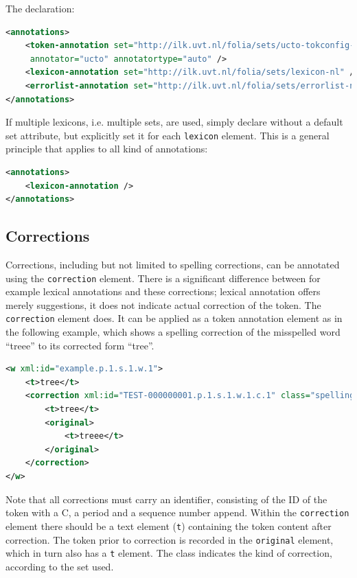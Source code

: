 \documentclass[a4paper,12pt]{report}
\begin{document}
The declaration:

\begin{lstlisting}[language=xml]
<annotations>
    <token-annotation set="http://ilk.uvt.nl/folia/sets/ucto-tokconfig-nl"
     annotator="ucto" annotatortype="auto" />
    <lexicon-annotation set="http://ilk.uvt.nl/folia/sets/lexicon-nl" />
    <errorlist-annotation set="http://ilk.uvt.nl/folia/sets/errorlist-nl" />
</annotations>
\end{lstlisting}

If multiple lexicons, i.e. multiple sets, are used, simply declare without a default set attribute, but explicitly set it for each \texttt{lexicon} element. This is a general principle that applies to all kind of annotations:

\begin{lstlisting}[language=xml]
<annotations>
    <lexicon-annotation />
</annotations>
\end{lstlisting}

\subsection{Corrections}

Corrections, including but not limited to spelling corrections, can be annotated using the \texttt{correction} element. There is a significant difference between for example lexical annotations and these corrections; lexical annotation offers merely suggestions, it does not indicate actual correction of the token. The \texttt{correction} element does. It can be applied as a token annotation element as in the following example, which shows a spelling correction of the misspelled word ``treee'' to its corrected form ``tree''.


\begin{lstlisting}[language=xml]
<w xml:id="example.p.1.s.1.w.1">
    <t>tree</t>
    <correction xml:id="TEST-000000001.p.1.s.1.w.1.c.1" class="spelling">
        <t>tree</t>
        <original>
            <t>treee</t>
        </original>
    </correction>
</w>
\end{lstlisting}

Note that all corrections must carry an identifier, consisting of the ID of the token with a C, a period and a sequence number append. Within the \texttt{correction} element there should be a text element (\texttt{t}) containing the token content after correction. The token prior to correction is recorded in the \texttt{original} element, which in turn also has a \texttt{t} element. The class indicates the kind of correction, according to the set used. 
\end{document}
